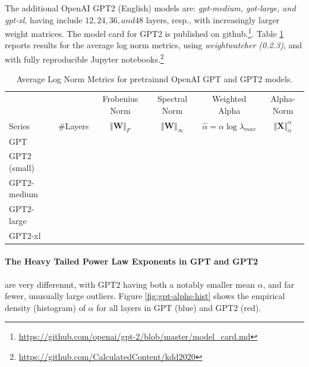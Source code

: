 The additional OpenAI GPT2 (English) models are: \emph{gpt-medium, got-large, and gpt-xl}, 
having include $12, 24, 36, and 48$ layers, resp., with increasingly larger weight matrices.
The model card for GPT2 is published on github.\footnote{\url{https://github.com/openai/gpt-2/blob/master/model_card.md}}.
Table \ref{table:nlp} reports results for the average log norm metrics, using \emph{weightwatcher (0.2.3)},
and with fully reproducible Jupyter notebooks.\footnote{\url{https://github.com/CalculatedContent/kdd2020}}


\begin{table}[t]
\small
\begin{center}
\begin{tabular}{|p{1in}|c|c|c|c|c|}
\hline
   &    & Frobenius Norm & Spectral Norm & Weighted Alpha & Alpha-Norm \\
 Series & \#Layers   & $\Vert\mathbf{W}\Vert_{F}$ & $\Vert\mathbf{W}\Vert_{\infty}$ & $\hat{\alpha}=\alpha\log\lambda_{max}$ & $\Vert\mathbf{X}\Vert^{\alpha}_{\alpha}$ \\
\hline
 GPT & & & & \\
 GPT2 (small) & & & & \\
 GPT2-medium & & & & \\
 GPT2-large & & & & \\
 GPT2-xl & & & & \\

\hline
\end{tabular}
\end{center}
\caption{Average Log Norm Metrics for pretrainnd OpenAI GPT and GPT2 models.}
\label{table:nlp}
\end{table}


\paragraph{The Heavy Tailed Power Law Exponents in GPT and GPT2}

are very differenmt, with GPT2 having both a notably smaller mean $\alpha$, and far fewer, unusually large outliers.
Figure \ref{fig:gpt-alphs-hist} shows the empirical density (histogram) of $\alpha$
for all layers in GPT (blue) and GPT2 (red).  

